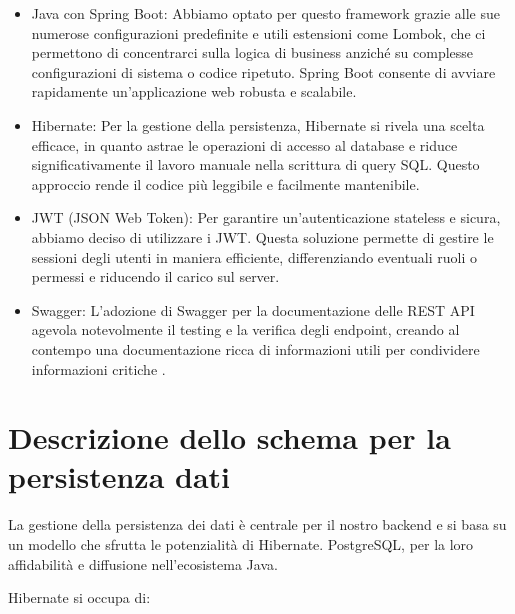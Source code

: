 \begin{itemize}
    \item Java con Spring Boot: Abbiamo optato per questo framework grazie alle sue numerose configurazioni predefinite e utili estensioni come Lombok, che ci permettono di concentrarci sulla logica di business anziché su complesse configurazioni di sistema o codice ripetuto. Spring Boot consente di avviare rapidamente un'applicazione web robusta e scalabile.
    \item Hibernate: Per la gestione della persistenza, Hibernate si rivela una scelta efficace, in quanto astrae le operazioni di accesso al database e riduce significativamente il lavoro manuale nella scrittura di query SQL. Questo approccio rende il codice più leggibile e facilmente mantenibile.
    \item JWT (JSON Web Token): Per garantire un'autenticazione stateless e sicura, abbiamo deciso di utilizzare i JWT. Questa soluzione permette di gestire le sessioni degli utenti in maniera efficiente, differenziando eventuali ruoli o permessi e riducendo il carico sul server.
    \item Swagger: L’adozione di Swagger per la documentazione delle REST API agevola notevolmente il testing e la verifica degli endpoint, creando al contempo una documentazione ricca di informazioni utili per condividere informazioni critiche .
\end{itemize}

 
\section{Descrizione dello schema per la persistenza dati}
La gestione della persistenza dei dati è centrale per il nostro backend e si basa su un modello che sfrutta le potenzialità di Hibernate.  PostgreSQL, per la loro affidabilità e diffusione nell’ecosistema Java.

Hibernate si occupa di:

